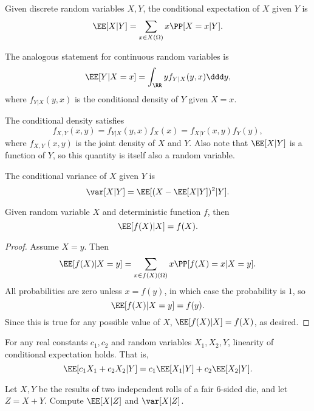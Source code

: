 \begin{definition}

Given discrete random variables $X,Y$, the \ac{conditional expectation} of $X$ given $Y$ is 
\[\EE[X\vert Y] = \sum_{x\in X(\Omega)}x\PP[X=x | Y].\]

The analogous statement for continuous random variables is 
\[\EE[Y | X=x] = \int_{\RR} yf_{Y|X}(y,x)\ddd y,\]
where $f_{Y|X}(y,x)$ is the \ac{conditional density} of $Y$ given $X=x$. 
\end{definition}

The conditional density satisfies 
\[f_{X,Y}(x,y) = f_{Y|X}(y,x)f_X(x) = f_{X|Y}(x,y)f_Y(y),\]
where $f_{X,Y}(x,y)$ is the joint density of $X$ and $Y$. Also note that $\EE[X\vert Y]$ is a function of $Y$, so this quantity is itself also a random variable.

\begin{definition}

The \ac{conditional variance} of $X$ given $Y$ is 
\[\var[X | Y] = \EE[(X - \EE[X\vert Y])^2\vert Y].\]
\end{definition}

\begin{theorem}

Given random variable $X$ and deterministic function $f$, then
\[\EE[f(X)\vert X] = f(X).\]
\end{theorem}

\begin{proof}
Assume $X=y$. Then
\[\EE[f(X)|X=y] = \sum_{x\in f(X)(\Omega)}x\PP[f(X)=x\vert X=y].\]
All probabilities are zero unless $x=f(y)$, in which case the probability is $1$, so 
\[\EE[f(X)|X=y] = f(y).\]
Since this is true for any possible value of $X$, $\EE[f(X)|X] = f(X)$, as desired. 
\end{proof}


\begin{theorem}

For any real constants $c_1, c_2$ and random variables $X_1, X_2, Y$, linearity of conditional expectation holds. That is, 
\[\EE[c_1X_1 + c_2X_2 | Y] = c_1\EE[X_1|Y] + c_2\EE[X_2|Y].\]
\end{theorem}

\begin{example}
\exlabel

Let $X,Y$ be the results of two independent rolls of a fair $6$-sided die, and let $Z = X+Y$. Compute $\EE[X|Z]$ and $\var[X|Z]$. 
\end{example}

